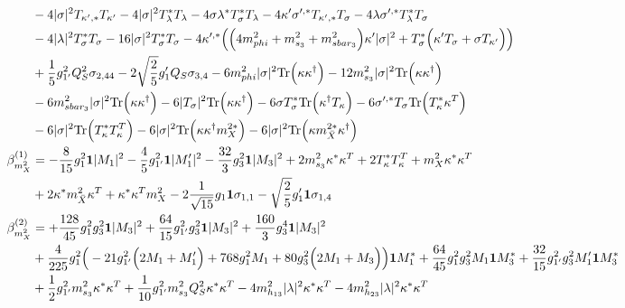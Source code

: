 {\begin{align}
 &-4 |\sigma|^2 T_{\kappa^{\prime},*} T_{\kappa^\prime} -4 |\sigma|^2 T_{\lambda}^* T_{\lambda} -4 \sigma \lambda^* T_{\sigma}^* T_{\lambda} -4 \kappa^\prime \sigma^{\prime,*} T_{\kappa^{\prime},*} T_{\sigma} -4 \lambda \sigma^{\prime,*} T_{\lambda}^* T_{\sigma} \nonumber \\ 
 &-4 |\lambda|^2 T_{\sigma}^* T_{\sigma} -16 |\sigma|^2 T_{\sigma}^* T_{\sigma} -4 \kappa^{\prime,*} \Big(\Big(4 m_{phi}^2  + m_{s_3}^2 + m_{sbar_3}^2\Big)\kappa^\prime |\sigma|^2  + T_{\sigma}^* \Big(\kappa^\prime T_{\sigma}  + \sigma T_{\kappa^\prime} \Big)\Big)\nonumber \\ 
 &+\frac{1}{5} g_{1'}^{2} Q_{S}^{2} \sigma_{2,44} -2 \sqrt{\frac{2}{5}} g_1' Q_{S} \sigma_{3,4} -6 m_{phi}^2 |\sigma|^2 \mbox{Tr}\Big({\kappa  \kappa^{\dagger}}\Big) -12 m_{s_3}^2 |\sigma|^2 \mbox{Tr}\Big({\kappa  \kappa^{\dagger}}\Big) \nonumber \\ 
 &-6 m_{sbar_3}^2 |\sigma|^2 \mbox{Tr}\Big({\kappa  \kappa^{\dagger}}\Big) -6 |T_{\sigma}|^2 \mbox{Tr}\Big({\kappa  \kappa^{\dagger}}\Big) -6 \sigma T_{\sigma}^* \mbox{Tr}\Big({\kappa^{\dagger}  T_{\kappa}}\Big) -6 \sigma^{\prime,*} T_{\sigma} \mbox{Tr}\Big({T_{\kappa}^*  \kappa^{T}}\Big) \nonumber \\ 
 &-6 |\sigma|^2 \mbox{Tr}\Big({T_{\kappa}^*  T_{\kappa}^{T}}\Big) -6 |\sigma|^2 \mbox{Tr}\Big({\kappa  \kappa^{\dagger}  m_{X}^{2 *}}\Big) -6 |\sigma|^2 \mbox{Tr}\Big({\kappa  m_{\bar{X}}^{2 *}  \kappa^{\dagger}}\Big) \\ 
\beta_{m_{X}^2}^{(1)} & =  
-\frac{8}{15} g_{1}^{2} {\bf 1} |M_1|^2 -\frac{4}{5} g_{1'}^{2} {\bf 1} |M_1'|^2 -\frac{32}{3} g_{3}^{2} {\bf 1} |M_3|^2 +2 m_{s_3}^2 {\kappa^*  \kappa^{T}} +2 {T_{\kappa}^*  T_{\kappa}^{T}} +{m_{X}^2  \kappa^*  \kappa^{T}}\nonumber \\ 
 &+2 {\kappa^*  m_{\bar{X}}^2  \kappa^{T}} +{\kappa^*  \kappa^{T}  m_{X}^2}-2 \frac{1}{\sqrt{15}} g_1 {\bf 1} \sigma_{1,1} - \sqrt{\frac{2}{5}} g_1' {\bf 1} \sigma_{1,4} \\ 
\beta_{m_{X}^2}^{(2)} & =  
+\frac{128}{45} g_{1}^{2} g_{3}^{2} {\bf 1} |M_3|^2 +\frac{64}{15} g_{1'}^{2} g_{3}^{2} {\bf 1} |M_3|^2 +\frac{160}{3} g_{3}^{4} {\bf 1} |M_3|^2 \nonumber \\ 
 &+\frac{4}{225} g_{1}^{2} \Big(-21 g_{1'}^{2} \Big(2 M_1  + M_1'\Big) + 768 g_{1}^{2} M_1  + 80 g_{3}^{2} \Big(2 M_1  + M_3\Big)\Big){\bf 1} M_1^* +\frac{64}{45} g_{1}^{2} g_{3}^{2} M_1 {\bf 1} M_3^* +\frac{32}{15} g_{1'}^{2} g_{3}^{2} M_1' {\bf 1} M_3^* \nonumber \\ 
 &+\frac{1}{2} g_{1'}^{2} m_{s_3}^2 {\kappa^*  \kappa^{T}} +\frac{1}{10} g_{1'}^{2} m_{s_3}^2 Q_{S}^{2} {\kappa^*  \kappa^{T}} -4 m_{h_{13}}^2 |\lambda|^2 {\kappa^*  \kappa^{T}} -4 m_{h_{23}}^2 |\lambda|^2 {\kappa^*  \kappa^{T}} \nonumber \\ 

\end{align}}
